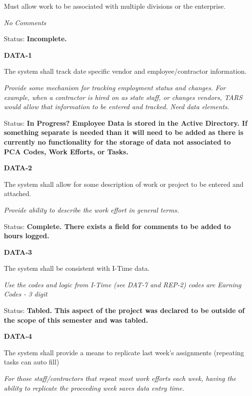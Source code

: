 \documentclass{article}
\begin{document}
\noindent Must allow work to be associated with multiple divisions or the enterprise.

\textit{No Comments}

 Status: \textbf{Incomplete.}

\noindent 

\noindent \textbf{DATA-1}

\noindent The system shall track date specific vendor and employee/contractor information.

\noindent \textit{Provide some mechanism for tracking employment status and changes. For example, when a contractor is hired on as state staff, or changes vendors, TARS would allow that information to be entered and tracked. Need data elements.}

\noindent Status: \textbf{In Progress?  Employee Data is stored in the Active Directory.  If something separate is needed than it will need to be added as there is currently no functionality for the storage of data not associated to PCA Codes, Work Efforts, or Tasks.}\textit{}

\noindent \textit{}

\noindent \textbf{DATA-2}

\noindent The system shall allow for some description of work or project to be entered and attached.

\textit{Provide ability to describe the work effort in general terms.}

Status: \textbf{Complete.  There exists a field for comments to be added to hours logged.}\textit{}

\noindent 

\noindent \textbf{DATA-3}

\noindent The system shall be consistent with I-Time data.

\textit{Use the codes and logic from I-Time (see DAT-7 and REP-2) codes are Earning Codes - 3 digit}

\noindent Status: \textbf{Tabled.  This aspect of the project was declared to be outside of the scope of this semester and was tabled.}\textit{}

\noindent 

\noindent \textbf{DATA-4}

\noindent The system shall provide a means to replicate last week's assignments (repeating tasks can auto fill)

\noindent \textit{For those staff/contractors that repeat most work efforts each week, having the ability to replicate the proceeding week saves data entry time.}
\end{document}
